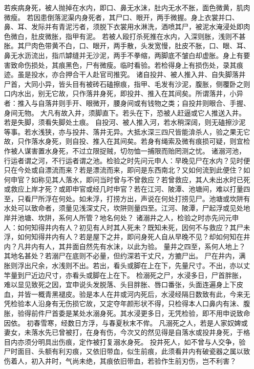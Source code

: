 \documentclass[12pt,UTF8]{ctexbook}
\begin{document}
若疾病身死，被人抛掉在水内，即口、鼻无水沫，肚内无水不胀，面色微黄，肌肉微瘦。
若因患倒落泥渠内身死者，其尸口、眼开，两手微握。身上衣裳并口、鼻、耳、发际并有青泥污者，须脱下衣裳用水淋洗，酒喷其尸，被泥水淹浸处即肉色微白，肚皮微胀，指甲有泥。
若被人殴打杀死推在水内，入深则胀，浅则不甚胀。其尸肉色带黄不白，口、眼开，两手散，头发宽慢，肚皮不胀，口、眼、耳、鼻无水沥流出，指爪罅缝并无沙泥，两手不拳缩，两脚底不皱白却虚胀。身上有要害致命伤损处，其痕黑色，尸有微瘦。临时看验。若检得身上有损伤处，录其痕迹。虽是投水，亦合押合干人赴官司推究。
诸自投井、被人推入井、自失脚落井尸首，大同小异，皆头目有被砖石磕擦痕，指甲、毛发有沙泥，腹胀，侧覆卧之则口内水出，别无它故，只作落井身死，即投井、推入在其间矣。所谓落井，小异者：推入与自落井则手开、眼微开，腰身间或有钱物之类；自投井则眼合、手握、身间无物。
大凡有故入井，须脚直下。若头在下，恐被人赶逼或它人推送入井。若是失脚，须看失脚处土痕。
自投河、被人推入河，若水稍深阔，则无磕擦沙泥等事。若水浅狭，亦与投井、落井无异。大抵水深三四尺皆能渰杀人，验之果无它故，只作落水身死，则自投、推入在其间矣。若身有绳索及微有痕损可疑，则宜检作被人谋害置水身死，不过立限捉贼，切勿恤一捕限而贻罔测之忧。
诸溺河池，行运者谓之河，不行运者谓之池。检验之时先问元申人：早晚见尸在水内？见时便只在今处或自漂流而来？若是漂流而来，即问是东西南北？又如何流到此便住？如何申官？如称见其人落水，即问当时曾与不曾救应？若曾救应，其人未出水时已死或救应上岸才死？或即申官或经几时申官？若在江河、陂潭、池塘间，难以打量四至，只看尸所浮在何处。如未浮，打捞方出，声说在何处打捞见尸。池塘或坎阱有水处可以致命者，须量见浅深丈尺，坎阱则量四至。江河、陂潭，尸起浮或见处地岸并池塘、坎阱，系何人所管？地名何处？
诸溺井之人，检验之时亦先问元申人：如何知得井内有人？初见有人时其人死未？既知未死，因何不与救应？其尸未浮，如何知得井内有人？若是屋下之井，即问身死人自从早晚不见？却如何知在井内？凡井内有人，其井面自然先有水沫，以此为验。
量井之四至，系何人地上？其地名甚处？若溺尸在底则不必量，但约深若干丈尺，方摝尸出。
尸在井内，满胀则浮出尺余，水浅则不出。若出，看头或脚在上在下，先量尺寸。不出，亦以丈竿量到尸近边尺寸，亦看头或脚在上在下。
检溺死之尸，水浸多日，尸首胖胀，难以显见致死之因，宜申说头发脱落、头目胖胀、唇口番张，头面连遍身上下皮血，并皆一概青黑褪皮。验是本人在井或河内死后，水浸经隔日数致有此，今来无凭检验本人沿身有无伤损它故，又定夺年颜形状不得，只检得本人口鼻内有沫、腹胀，验得前件尸首委是某处水溺身死。其水浸更多日，无凭检验，即不用申说致命因依。
初春雪寒，经数日方浮，与春夏秋末不侔。
凡溺死之人，若是人家奴婢或妻女，未落水先已曾被打，在身有伤，今次又的然见得是自落水或投井身死，于格目内亦须分明具出伤痕，定作被打复溺水身死。
投井死人，如不曾与人交争，验尸时面目、头额有利刃痕，又依旧带血，似生前痕，此须看井内有破瓷器之属以致伤着人，初入井时，气尚未绝，其痕依旧带血，若验作生前刃伤，岂不利害？
\end{document}
